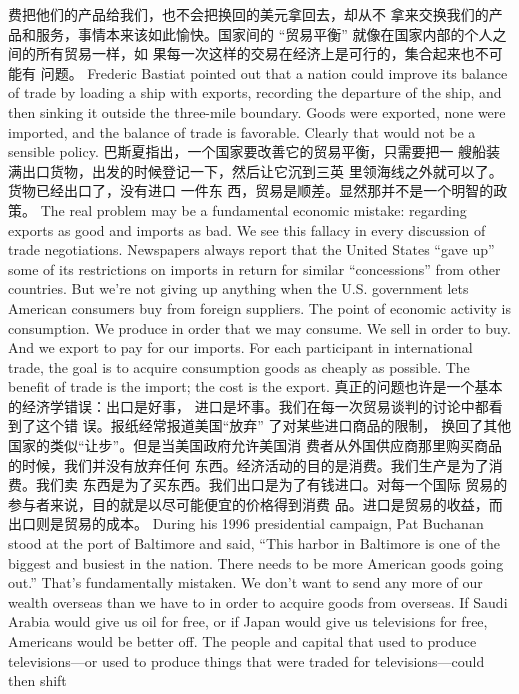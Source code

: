 \begin{paracol}{2}
费把他们的产品给我们，也不会把换回的美元拿回去，却从不
拿来交换我们的产品和服务，事情本来该如此愉快。国家间的
“贸易平衡” 就像在国家内部的个人之间的所有贸易一样，如
果每一次这样的交易在经济上是可行的，集合起来也不可能有
问题。
\switchcolumn*
Frederic Bastiat pointed out that a nation could improve its
balance of trade by loading a ship with exports, recording the
departure of the ship, and then sinking it outside the three-mile
boundary. Goods were exported, none were imported, and the
balance of trade is favorable. Clearly that would not be a sensible policy.
\switchcolumn
巴斯夏指出，一个国家要改善它的贸易平衡，只需要把一
艘船装满出口货物，出发的时候登记一下，然后让它沉到三英
里领海线之外就可以了。货物已经出口了，没有进口 一件东
西，贸易是顺差。显然那并不是一个明智的政策。
\switchcolumn*
The real problem may be a fundamental economic mistake:
regarding exports as good and imports as bad. We see this fallacy in every discussion of trade negotiations. Newspapers always report that the United States ``gave up'' some of its
restrictions on imports in return for similar ``concessions'' from
other countries. But we're not giving up anything when the
U.S. government lets American consumers buy from foreign
suppliers. The point of economic activity is consumption. We
produce in order that we may consume. We sell in order to buy.
And we export to pay for our imports. For each participant in
international trade, the goal is to acquire consumption goods as
cheaply as possible. The benefit of trade is the import; the cost
is the export.
\switchcolumn
真正的问题也许是一个基本的经济学错误：出口是好事，
进口是坏事。我们在每一次贸易谈判的讨论中都看到了这个错
误。报纸经常报道美国“放弃” 了对某些进口商品的限制，
换回了其他国家的类似“让步”。但是当美国政府允许美国消
费者从外国供应商那里购买商品的时候，我们并没有放弃任何
东西。经济活动的目的是消费。我们生产是为了消费。我们卖
东西是为了买东西。我们出口是为了有钱进口。对每一个国际
贸易的参与者来说，目的就是以尽可能便宜的价格得到消费
品。进口是贸易的收益，而出口则是贸易的成本。
\switchcolumn*
During his 1996 presidential campaign, Pat Buchanan stood
at the port of Baltimore and said, ``This harbor in Baltimore is
one of the biggest and busiest in the nation. There needs to be
more American goods going out.'' That's fundamentally mistaken. We don't want to send any more of our wealth overseas
than we have to in order to acquire goods from overseas. If
Saudi Arabia would give us oil for free, or if Japan would give us
televisions for free, Americans would be better off. The people
and capital that used to produce televisions---or used to produce things that were traded for televisions---could then shift

\end{paracol}
